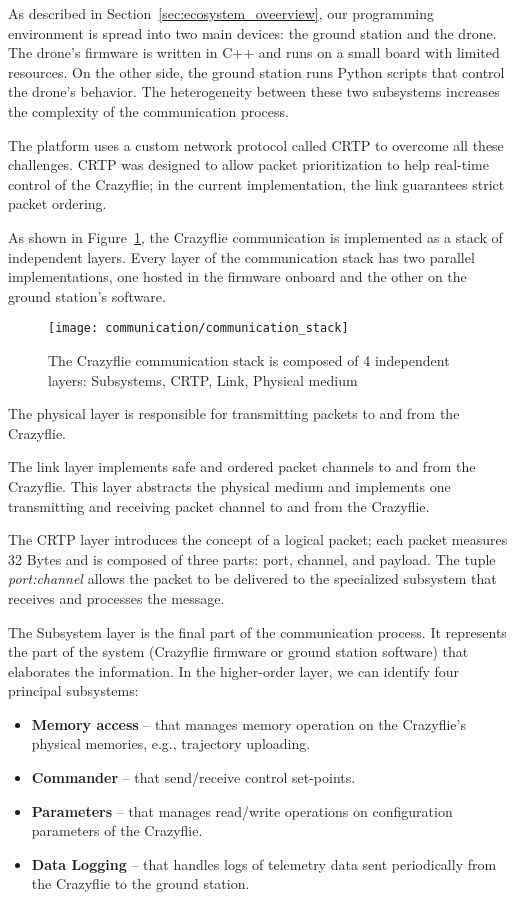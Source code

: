 As described in Section~\ref{sec:ecosystem_oveerview}, our programming environment is spread into two main devices: the ground station and the drone.
The drone's firmware is written in C++ and runs on a small board with limited resources. On the other side, the ground station runs Python scripts
that control the drone's behavior. The heterogeneity between these two subsystems increases the complexity of the communication process.

The platform uses a custom network protocol called CRTP to overcome all these challenges. 
CRTP was designed to allow packet prioritization to help real-time control of the Crazyflie; in the current implementation, the link guarantees strict packet ordering.

As shown in Figure~\ref{fig:communication_stack}, the Crazyflie communication is implemented as a stack of independent layers.
Every layer of the communication stack has two parallel implementations, one hosted in the firmware onboard and the other on the ground station's software.

\begin{figure}[tb]
    \centering
    \texttt{[image: communication/communication\_stack]}
    \caption[The Crazyflie communication stack]{The Crazyflie communication stack is composed of 4 independent layers: Subsystems, CRTP, Link, Physical medium}
    \label{fig:communication_stack}
\end{figure}

The physical layer is responsible for transmitting packets to and from the Crazyflie. 

The link layer implements safe and ordered packet channels to and from the Crazyflie. This layer abstracts the physical medium and implements one transmitting and receiving packet channel to and from the Crazyflie.

The CRTP layer introduces the concept of a logical packet; each packet measures 32 Bytes and is composed of three parts: port, channel, and payload.
The tuple \textit{port:channel} allows the packet to be delivered to the specialized subsystem that receives and processes the message.

The Subsystem layer is the final part of the communication process. It represents the part of the system (Crazyflie firmware or ground station software) that elaborates the information.
In the higher-order layer, we can identify four principal subsystems:
\begin{itemize}
    \item \textbf{Memory access} -- that manages memory operation on the Crazyflie's physical memories, e.g., trajectory uploading.
    \item \textbf{Commander} -- that send/receive control set-points.
    \item \textbf{Parameters} -- that manages read/write operations on configuration parameters of the Crazyflie.
    \item \textbf{Data Logging} -- that handles logs of telemetry data sent periodically from the Crazyflie to the ground station. 
\end{itemize} 

